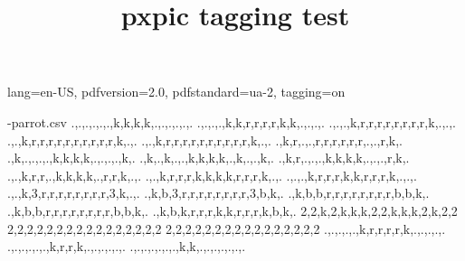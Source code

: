 \ifdefined\Uchar\RequirePackage{luatagging}\fi
\DocumentMetadata
  {
    lang=en-US,
    pdfversion=2.0,
    pdfstandard=ua-2,
    tagging=on
  }
\begin{filecontents*}[overwrite]{\jobname-parrot.csv}
.,.,.,.,.,.,k,k,k,k,.,.,.,.,.,.
.,.,.,.,k,k,r,r,r,r,k,k,.,.,.,.
.,.,.,k,r,r,r,r,r,r,r,r,k,.,.,.
.,.,k,r,r,r,r,r,r,r,r,r,r,k,.,.
.,.,k,r,r,r,r,r,r,r,r,r,r,k,.,.
.,k,r,.,.,r,r,r,r,r,r,.,.,r,k,.
.,k,.,.,.,.,k,k,k,k,.,.,.,.,k,.
.,k,.,k,.,.,k,k,k,k,.,k,.,.,k,.
.,k,r,.,.,.,k,k,k,k,.,.,.,r,k,.
.,.,k,r,r,.,k,k,k,k,.,r,r,k,.,.
.,.,k,r,r,r,k,k,k,k,r,r,r,k,.,.
.,.,.,k,r,r,r,k,k,r,r,r,k,.,.,.
.,.,k,3,r,r,r,r,r,r,r,r,3,k,.,.
.,k,b,3,r,r,r,r,r,r,r,r,3,b,k,.
.,k,b,b,r,r,r,r,r,r,r,r,b,b,k,.
.,k,b,b,r,r,r,r,r,r,r,r,b,b,k,.
.,k,b,k,r,r,r,k,k,r,r,r,k,b,k,.
2,2,k,2,k,k,k,2,2,k,k,k,2,k,2,2
2,2,2,2,2,2,2,2,2,2,2,2,2,2,2,2
2,2,2,2,2,2,2,2,2,2,2,2,2,2,2,2
.,.,.,.,.,k,r,r,r,r,k,.,.,.,.,.
.,.,.,.,.,.,k,r,r,k,.,.,.,.,.,.
.,.,.,.,.,.,.,k,k,.,.,.,.,.,.,.
\end{filecontents*}

\documentclass{article}
\usepackage{pxpic}

\title{pxpic tagging test}

\pxpicsetup
  {
    mode = px
    ,colours = {k=black, r=[HTML]{9F393D}, g=green!75!black, b=[rgb]{0,0,1}}
    ,skip = .
    ,size = 10pt
  }



text
\pxpic
  {
    {.k}
    {kkk}
    {.k}
  }



